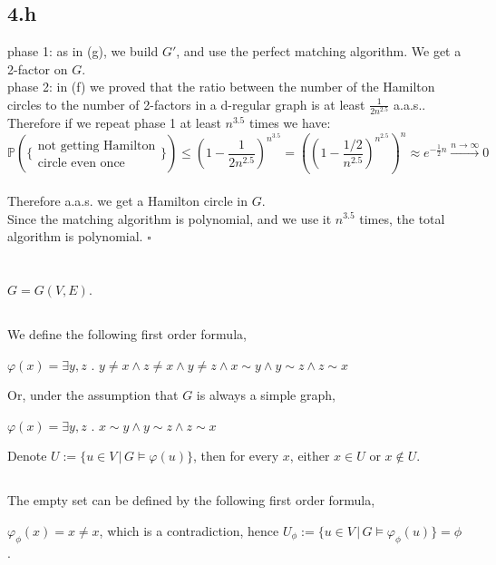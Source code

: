 \documentclass{article}
\begin{document}
\subsection*{4.h}
phase 1: as in (g), we build $G'$, and use the perfect matching algorithm. We get a 2-factor on $G$.\\
phase 2: in (f) we proved that the ratio between the number of the Hamilton circles to the number of 2-factors in a d-regular graph is at least $\frac{1}{2n^{2.5}}$ a.a.s.. Therefore if we repeat phase 1 at least $n^{3.5}$ times we have:
\[
\mathbb{P}(\{\substack{\text{not getting Hamilton} \\ \text{circle even once}}\})\leq(1-\frac{1}{2n^{2.5}})^{n^{3.5}}=((1-\frac{1/2}{n^{2.5}})^{n^{2.5}})^n\approx e^{-\frac{1}{2}n}\xrightarrow{n \to \infty}0
\]\\
Therefore a.a.s. we get a Hamilton circle in $G$.\\
Since the matching algorithm is polynomial, and we use it $n^{3.5}$ times, the total algorithm is polynomial.
\hfill $\square$
\section{}
$G=G(V,E)$.
\subsection{}
We define the following first order formula,

$\varphi(x)=\exists{y,z}$ . $y\neq{x}\land{z\neq{x}}\land{y\neq{z}}\land{x\sim{y}}\land{y\sim{z}}\land{z\sim{x}}$

Or, under the assumption that $G$ is always a simple graph,

$\varphi(x)=\exists{y,z}$ . $x\sim{y}\land{y\sim{z}}\land{z\sim{x}}$

Denote $U:=\{u\in{V}\,|\,{G\vDash\varphi(u)}\}$, then for every $x$, either $x\in{U}$ or $x\notin{U}$.
\subsection{}
\subsection{}
The empty set can be defined by the following first order formula,

$\varphi_\phi(x)=x\neq{x}$, which is a contradiction, hence $U_\phi:=\{u\in{V}\,|\,{G\vDash\varphi_\phi(u)}\}=\phi$.
\end{document}
